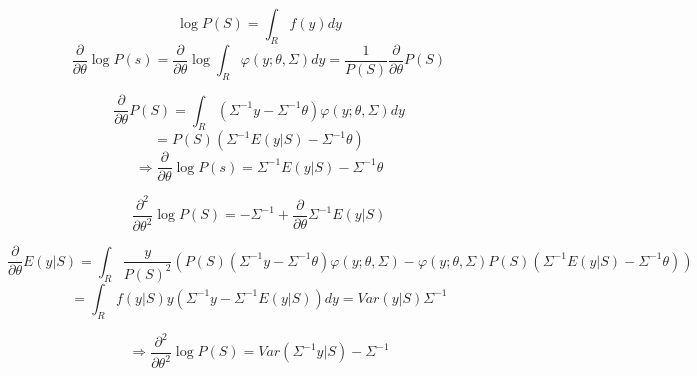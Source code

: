 \documentclass{article}
\begin{document}
$$
\log P(S) = \int_R f(y) dy 
$$$$
\frac{\partial}{\partial \theta} \log P(s) 
= \frac{\partial}{\partial\theta} \log \int_R \varphi(y;\theta,\Sigma) dy 
= \frac{1}{P(S)} \frac{\partial}{\partial \theta} P(S)
$$

$$
\frac{\partial}{\partial\theta} P(S) = \int_R \left(\Sigma^{-1}y - \Sigma^{-1}\theta \right)  \varphi(y;\theta, \Sigma)dy
$$$$
= P(S) \left(\Sigma^{-1}E(y|S) - \Sigma^{-1} \theta \right)
$$$$
\Rightarrow \frac{\partial}{\partial \theta} \log P(s)  = \Sigma^{-1}E(y|S) - \Sigma^{-1} \theta
$$

$$
\frac{\partial^{2}}{\partial\theta^{2}} \log P(S) = 
-\Sigma^{-1} + \frac{\partial}{\partial\theta} \Sigma^{-1} E(y|S)
$$

$$
\frac{\partial}{\partial\theta} E(y|S) =
\int_R \frac{y}{P(S)^{2}}\left(P(S) (\Sigma^{-1} y - \Sigma^{-1}\theta) \varphi(y;\theta,\Sigma) -\varphi(y; \theta,\Sigma) P(S)(\Sigma^{-1}E(y|S) -\Sigma^{-1}\theta)
\right)
$$$$
=\int_R f(y|S) y\left(\Sigma^{-1}y - \Sigma^{-1} E(y|S) \right)dy = Var(y|S)\Sigma^{-1}
$$

$$
\Rightarrow \frac{\partial^{2}}{\partial\theta^{2}} \log P(S) 
= Var(\Sigma^{-1}y|S) - \Sigma^{-1}
$$
\end{document}
